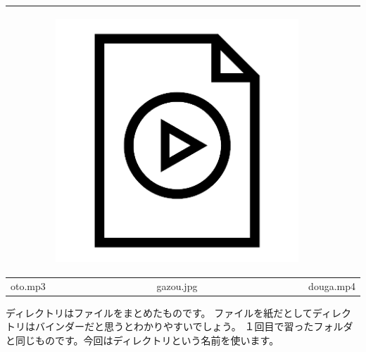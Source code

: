 \begin{table}[H]
\begin{center}
\begin{tabular}{|c|c|c|}
\begin{minipage}{0.3\hsize}
\begin{center}
      \end{center}
    \end{minipage} &
    \begin{minipage}{0.3\hsize}
      \begin{center}
        \includegraphics[width=\linewidth]{images/chap03/text03-img003.png}
      \end{center} 
    \end{minipage} \\ \hline
    oto.mp3 & gazou.jpg & douga.mp4 \\ \hline
  \end{tabular}
 \end{center}
\end{table}


ディレクトリはファイルをまとめたものです。
ファイルを紙だとしてディレクトリはバインダーだと思うとわかりやすいでしょう。
１回目で習ったフォルダと同じものです。今回はディレクトリという名前を使います。

